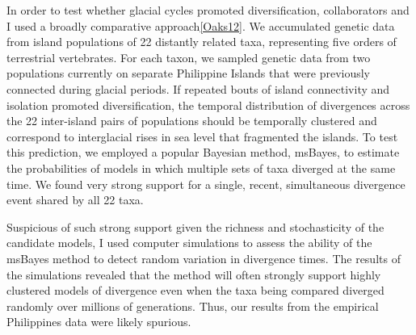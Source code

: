 
In order to test whether glacial cycles promoted diversification,
collaborators and I used a broadly comparative approach\cref{Oaks12}.
We accumulated genetic data from island populations of 22 distantly related
taxa, representing five orders of terrestrial vertebrates.
For each taxon, we sampled genetic data from two populations currently on
separate Philippine Islands that were previously connected during glacial
periods.
If repeated bouts of island connectivity and isolation promoted
diversification, the temporal distribution of divergences across the 22
inter-island pairs of populations should be temporally clustered and correspond
to interglacial rises in sea level that fragmented the islands.
To test this prediction, we employed a popular Bayesian method,
msBayes, to estimate the probabilities of models in which multiple sets of taxa
diverged at the same time.
We found very strong support
for a single, recent, simultaneous divergence event shared by all 22 taxa.

Suspicious of such strong support given the richness and stochasticity of the
candidate models,
I used computer simulations to assess the ability of the msBayes method to
detect random variation in divergence times.
The results of the simulations revealed that the method will often strongly
support highly clustered models of divergence even when the taxa being compared
diverged randomly over millions of generations.
Thus, our results from the empirical Philippines data were likely spurious.

